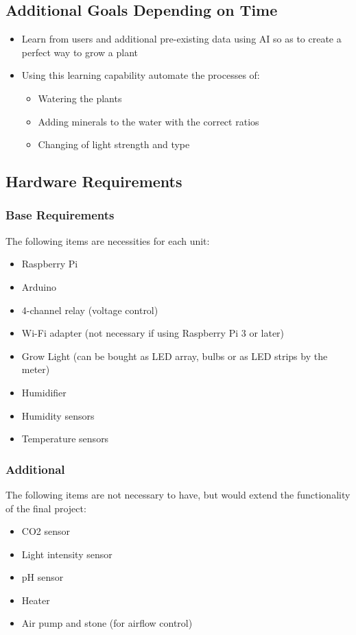 \documentclass{article}
\begin{document}
	\subsection{Additional Goals Depending on Time}
		\begin{itemize}
			\item Learn from users and additional pre-existing data using AI so as to create a perfect way to grow a plant
			\item Using this learning capability automate the processes of:
				\begin{itemize}
					\item Watering the plants
					\item Adding minerals to the water with the correct ratios
					\item Changing of light strength and type
				\end{itemize}
		\end{itemize}
	\subsection{Hardware Requirements}
		\subsubsection{Base Requirements}
			The following items are necessities for each unit:
			\begin{itemize}
				\item Raspberry Pi
				\item Arduino
				\item 4-channel relay (voltage control)
				\item Wi-Fi adapter (not necessary if using Raspberry Pi 3 or later)
				\item Grow Light (can be bought as LED array, bulbs or as LED strips by the meter)
				\item Humidifier
				\item Humidity sensors
				\item Temperature sensors
			\end{itemize}
		\subsubsection{Additional}
			The following items are not necessary to have, but would extend the functionality of the final project:
			\begin{itemize}
				\item CO2 sensor
				\item Light intensity sensor
				\item pH sensor
				\item Heater
				\item Air pump and stone (for airflow control)
			\end{itemize}
\end{document}
